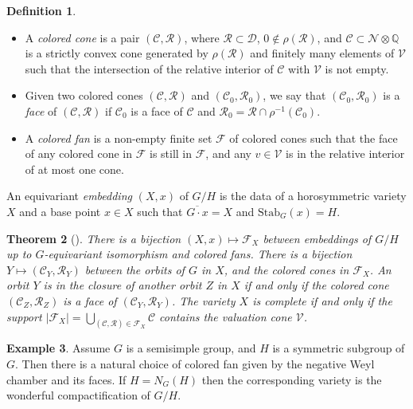 \documentclass{amsart}
\newtheorem{thm}{Theorem}[section]
\theoremstyle{definition}
\newtheorem{defn}[thm]{Definition}
\newtheorem{exa}[thm]{Example}
\begin{document}
\begin{defn}\mbox{}
\begin{itemize}
\item A \emph{colored cone} is a pair $(\mathcal{C},\mathcal{R})$, where 
$\mathcal{R}\subset \mathcal{D}$, $0\notin \rho(\mathcal{R})$, and 
$\mathcal{C}\subset \mathcal{N} \otimes \mathbb{Q}$ is a strictly convex cone 
generated by $\rho(\mathcal{R})$ and finitely many elements of $\mathcal{V}$
such that the intersection of the relative interior of $\mathcal{C}$ with 
$\mathcal{V}$ is not empty.
\item Given two colored cones $(\mathcal{C},\mathcal{R})$ and 
$(\mathcal{C}_0,\mathcal{R}_0)$, we say that $(\mathcal{C}_0,\mathcal{R}_0)$ is a 
\emph{face} of $(\mathcal{C},\mathcal{R})$ if $\mathcal{C}_0$ is a face of 
$\mathcal{C}$ and $\mathcal{R}_0=\mathcal{R}\cap \rho^{-1}(\mathcal{C}_0)$.
\item A \emph{colored fan} is a non-empty finite set $\mathcal{F}$ of colored cones 
such that the face of any colored cone in $\mathcal{F}$ is still in $\mathcal{F}$, 
and any $v\in \mathcal{V}$ is in the relative interior of at most one cone.
\end{itemize}
\end{defn}

An equivariant \emph{embedding} $(X,x)$ of $G/H$ is the data of a horosymmetric variety $X$ 
and a base point $x\in X$ such that $\overline{G\cdot x}=X$ and $\mathrm{Stab}_G(x)=H$. 

\begin{thm}[{\cite[Theorem 3.3 and Theorem 4.2]{Kno91}}]
\label{thm_class}
There is a bijection $(X,x) \longmapsto \mathcal{F}_X$ between embeddings of $G/H$ up to 
$G$-equivariant isomorphism and colored fans. 
There is a bijection $Y\mapsto (\mathcal{C}_Y, \mathcal{R}_Y)$ 
between the orbits of $G$ in $X$, and the colored cones in $\mathcal{F}_X$. 
An orbit $Y$ is in the closure of another orbit $Z$ in $X$ if and only if 
the colored cone $(\mathcal{C}_Z, \mathcal{R}_Z)$ is a face of 
$(\mathcal{C}_Y, \mathcal{R}_Y)$.
The variety $X$ is complete if and only if the support 
$|\mathcal{F}_X|=\bigcup_{(\mathcal{C},\mathcal{R})\in\mathcal{F}_X}\mathcal{C}$ 
contains the valuation cone $\mathcal{V}$.
\end{thm}

\begin{exa}
\label{exa_wond_colored_fan}
Assume $G$ is a semisimple group, and $H$ is a symmetric subgroup of $G$. 
Then there is a natural choice of colored fan given by the negative 
Weyl chamber and its faces. 
If $H=N_G(H)$ then the corresponding variety is the wonderful compactification 
of $G/H$.   
\end{exa}
\end{document}
